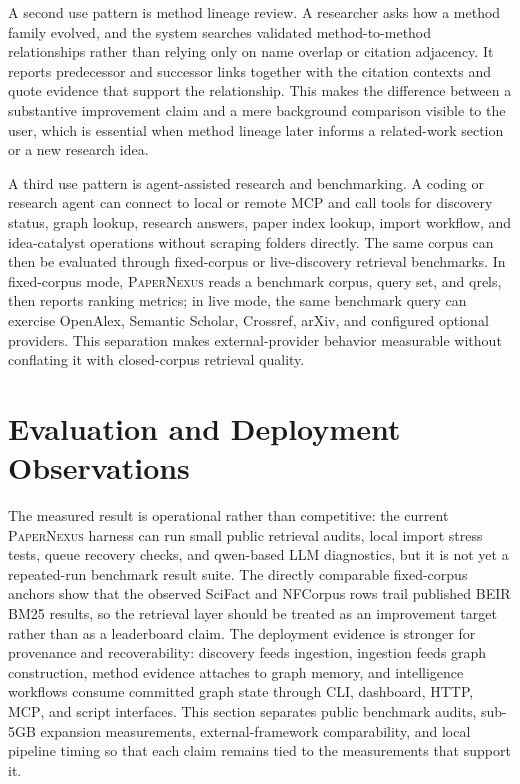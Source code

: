 \documentclass[11pt]{article}
\newcommand{\papernexus}{\textsc{PaperNexus}}
\newcommand{\mcp}{\textsc{MCP}}
\begin{document}
A second use pattern is method lineage review. A researcher asks how a method family evolved, and the system searches validated method-to-method relationships rather than relying only on name overlap or citation adjacency. It reports predecessor and successor links together with the citation contexts and quote evidence that support the relationship. This makes the difference between a substantive improvement claim and a mere background comparison visible to the user, which is essential when method lineage later informs a related-work section or a new research idea.

A third use pattern is agent-assisted research and benchmarking. A coding or research agent can connect to local or remote \mcp{} and call tools for discovery status, graph lookup, research answers, paper index lookup, import workflow, and idea-catalyst operations without scraping folders directly. The same corpus can then be evaluated through fixed-corpus or live-discovery retrieval benchmarks. In fixed-corpus mode, \papernexus{} reads a benchmark corpus, query set, and qrels, then reports ranking metrics; in live mode, the same benchmark query can exercise OpenAlex, Semantic Scholar, Crossref, arXiv, and configured optional providers. This separation makes external-provider behavior measurable without conflating it with closed-corpus retrieval quality.

\section{Evaluation and Deployment Observations}

The measured result is operational rather than competitive: the current \papernexus{} harness can run small public retrieval audits, local import stress tests, queue recovery checks, and qwen-based LLM diagnostics, but it is not yet a repeated-run benchmark result suite. The directly comparable fixed-corpus anchors show that the observed SciFact and NFCorpus rows trail published BEIR BM25 results, so the retrieval layer should be treated as an improvement target rather than as a leaderboard claim. The deployment evidence is stronger for provenance and recoverability: discovery feeds ingestion, ingestion feeds graph construction, method evidence attaches to graph memory, and intelligence workflows consume committed graph state through CLI, dashboard, HTTP, \mcp{}, and script interfaces. This section separates public benchmark audits, sub-5GB expansion measurements, external-framework comparability, and local pipeline timing so that each claim remains tied to the measurements that support it.
\end{document}
